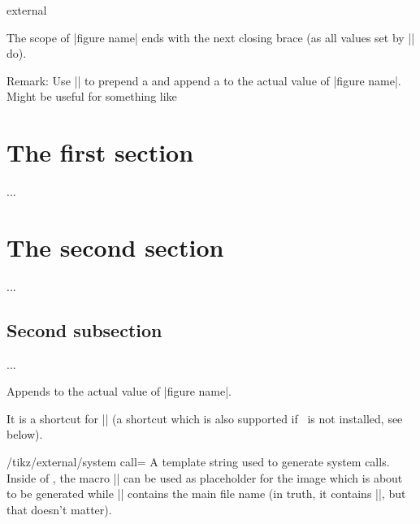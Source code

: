 {\begin{pgfplotslibrary}{external}
\begin{command}{}
\begin{codeexample}
\end{codeexample}
	The scope of |figure name| ends with the next closing brace (as all values set by |\tikzset| do).

	\medbreak
	Remark: Use || to prepend  a  and append a  to the actual value of |figure name|. Might be useful for something like
\begin{codeexample}
\tikzset{external/figure name=main}


\section{The first section}
{
	...
}

\section{The second section}
{
	...
	\subsection{Second subsection}
	{
		...
	}
}
\end{codeexample}
\end{command}

\begin{command}{\tikzappendtofigurename{}}
	Appends  to the actual value of |figure name|.

	It is a shortcut for || (a shortcut which is also supported if \tikzname\ is not installed, see below).
\end{command}


\begin{key}{/tikz/external/system call=}
\label{extlib:systemcall:option}
	A template string used to generate system calls. Inside of , the macro |\image| can be used as placeholder for the image which is about to be generated while |\texsource| contains the main file name (in truth, it contains ||, but that doesn't matter).


\end{key}
\end{pgfplotslibrary}}
